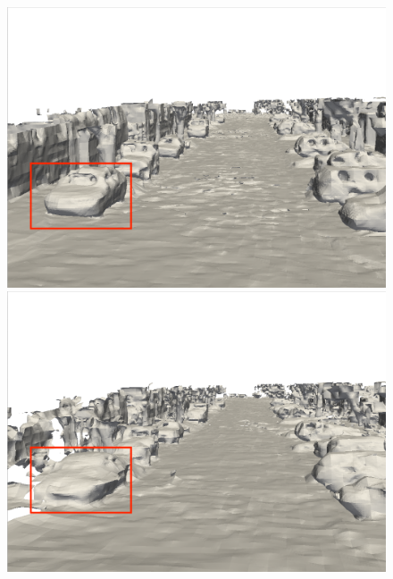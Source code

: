 \begin{figure}[htbp]
\begin{minipage}{0.5\linewidth}
	\end{minipage}
    \vfill
    \begin{minipage}{0.5\linewidth}
		\centering
		\includegraphics[width=1\linewidth]{figures/kitti_2_vox.png}
	\end{minipage}\hfill
	\begin{minipage}{0.5\linewidth}
		\centering
		\includegraphics[width=1\linewidth]{figures/kitti_2_bce.png}
	\end{minipage}
    \vfill
	\begin{minipage}{0.5\linewidth}
		\centering

\end{minipage}
\end{figure}

